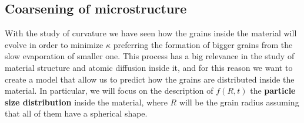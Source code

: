\subsection{Coarsening of microstructure}

With the study of curvature we have seen how the grains inside the material will evolve in order to minimize $\kappa$ preferring the formation of bigger grains from the slow evaporation of smaller one. This process has a big relevance in the study of material structure and atomic diffusion inside it, and for this reason we want to create a model that allow us to predict how the grains are distributed inside the material. In particular, we will focus on the description of $f(R, t)$ the \textbf{particle size distribution} inside the material, where $R$ will be the grain radius assuming that all of them have a spherical shape.


